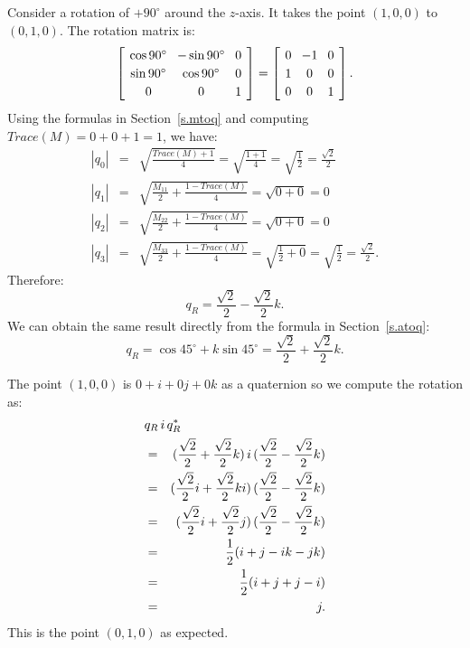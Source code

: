 \documentclass[11pt,a4paper]{report}
\newcommand*{\spacearray}{
\renewcommand{\arraystretch}{1.2}
\setlength{\arraycolsep}{4pt}
}
\begin{document}
Consider a rotation of $+90^\circ$ around the $z$-axis. It takes the point $(1,0,0)$ to $(0,1,0)$. The rotation matrix is:
\begin{displaymath}
\spacearray
\left[
\begin{array}{ccc}
\cos 90^\circ & -\sin 90^\circ & 0\\
\sin 90^\circ & \cos 90^\circ & 0\\
0&0&1\\
\end{array}
\right] =
\left[
\begin{array}{ccc}
0 & -1 & 0\\
1  & 0 & 0\\
0&0&1\\
\end{array}
\right].
\end{displaymath}
Using the formulas in Section~\ref{s.mtoq} and computing $\textit{Trace}(M)=0+0+1=1$, we have:
\begin{eqnarray*}
|q_0|&=&\sqrt{\frac{\textit{Trace}(M)+1}{4}}=\sqrt{\frac{1+1}{4}}=
\sqrt{\frac{1}{2}}=\frac{\sqrt{2}}{2}\\
|q_1|&=&\sqrt{\frac{M_{11}}{2}+\frac{1-\textit{Trace}(M)}{4}}=
\sqrt{0+0}=0\\
|q_2|&=&\sqrt{\frac{M_{22}}{2}+\frac{1-\textit{Trace}(M)}{4}}=
\sqrt{0+0}=0\\
|q_3|&=&\sqrt{\frac{M_{33}}{2}+\frac{1-\textit{Trace}(M)}{4}}=
\sqrt{\frac{1}{2}+0}=\sqrt{\frac{1}{2}}=\frac{\sqrt{2}}{2}.
\end{eqnarray*}
Therefore:
\begin{displaymath}
q_R = \frac{\sqrt{2}}{2} - \frac{\sqrt{2}}{2}k.
\end{displaymath}
We can obtain the same result directly from the formula in Section~\ref{s.atoq}:
\begin{displaymath}
q_R = \cos 45^\circ + k\sin 45^\circ = \frac{\sqrt{2}}{2} + \frac{\sqrt{2}}{2}k. 
\end{displaymath}

The point $(1,0,0)$ is $0+i+0j+0k$ as a quaternion so we compute the rotation as:
\begin{eqnarray*}
\lefteqn{q_R\, i \, q_R^*}\\
&=&(\frac{\sqrt{2}}{2} + \frac{\sqrt{2}}{2}k)\, i \, (\frac{\sqrt{2}}{2} -
 \frac{\sqrt{2}}{2}k)\\
&=&(\frac{\sqrt{2}}{2}i + \frac{\sqrt{2}}{2}ki)\, (\frac{\sqrt{2}}{2} -
 \frac{\sqrt{2}}{2}k)\\
&=&(\frac{\sqrt{2}}{2}i + \frac{\sqrt{2}}{2}j)\, (\frac{\sqrt{2}}{2} -
 \frac{\sqrt{2}}{2}k)\\
&=&\frac{1}{2}(i+j-ik-jk)\\
&=&\frac{1}{2}(i+j+j-i)\\
&=&j.
\end{eqnarray*}
This is the point $(0,1,0)$ as expected.
\end{document}
